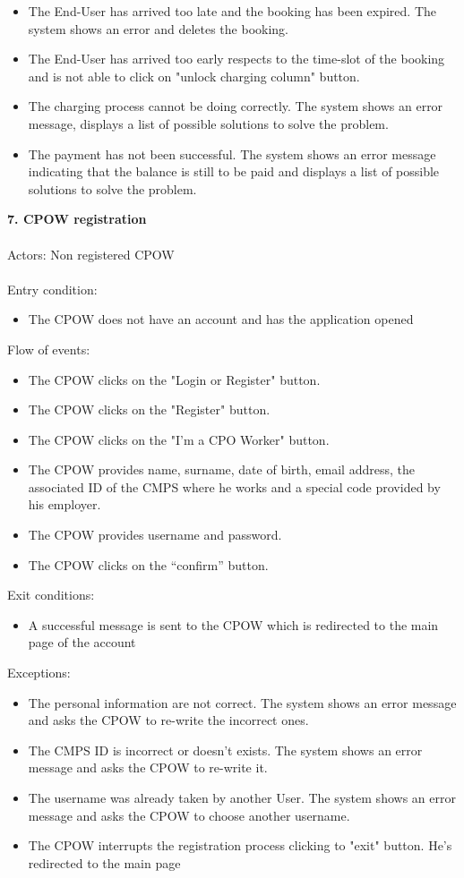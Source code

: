 \documentclass[a4paper]{report}
\begin{document}
\begin{itemize}
\item The End-User has arrived too late and the booking has been expired. The system shows an error and deletes the booking.
\item The End-User has arrived too early respects to the time-slot of the booking and is not able to click on "unlock charging column" button.
\item The charging process cannot be doing correctly. The system shows an error message, displays a list of possible solutions to solve the problem.
\item The payment has not been successful. The system shows an error message indicating that the balance is still to be paid and displays a list of possible solutions to solve the problem.
\end{itemize}
\textbf{7. CPOW registration}\label{uc:1}
\\
\\
Actors: Non registered CPOW\\ \\
Entry condition:
\begin{itemize}
\item The CPOW does not have an account and has the application opened
\end{itemize}
Flow of events:
\begin{itemize}
\item The CPOW clicks on the "Login or Register" button.
\item The CPOW clicks on the "Register" button.
\item The CPOW clicks on the "I'm a CPO Worker" button.
\item The CPOW provides name, surname, date of birth, email address, the associated ID of the CMPS where he works and a special code provided by his employer.
\item The CPOW provides username and password.
\item The CPOW clicks on the “confirm” button.
\end{itemize}
Exit conditions:
\begin{itemize}
\item A successful message is sent to the CPOW which is redirected to the main page of the account
\end{itemize}
Exceptions:
\begin{itemize}
\item The personal information are not correct. The system shows an error message and asks the CPOW to re-write the incorrect ones.
\item The CMPS ID is incorrect or doesn't exists. The system shows an error message and asks the CPOW to re-write it.
\item The username was already taken by another User. The system shows an error message and asks the CPOW to choose another username.
\item The CPOW interrupts the registration process clicking to "exit" button. He's redirected to the main page
\end{itemize}
\end{document}
